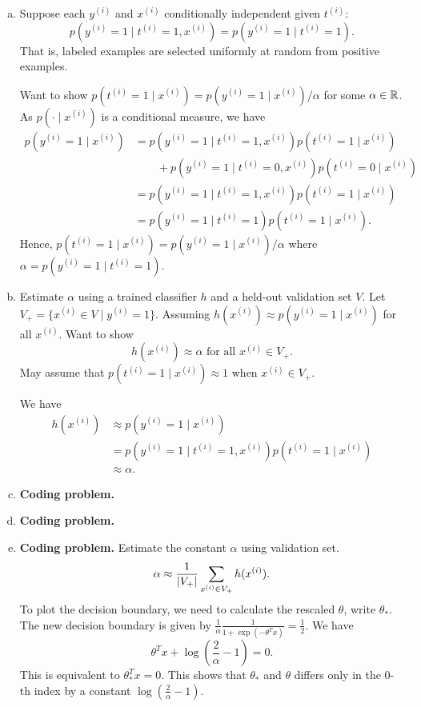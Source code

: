 \documentclass[12pt,letterpaper,boxed]{hmcpset}
\newcommand{\yy}{y^{(i)}}
\newcommand{\xx}{x^{(i)}}
\renewcommand{\tt}{t^{(i)}}
\begin{document}
\begin{solution}
\begin{enumerate}[(a)]
	\item Suppose each $\yy$ and $\xx$ conditionally independent given $\tt$:
	\[
	p(\yy = 1 \mid \tt = 1, \xx) = p(\yy = 1 \mid \tt = 1).
	\]
	That is, labeled examples are selected uniformly at random from positive examples.
	
	Want to show $p(\tt = 1 \mid \xx) = p(\yy = 1 \mid \xx) / \alpha$ for some $\alpha \in \mathbb{R}$. As $p(\cdot \mid \xx)$ is a conditional measure, we have
	\[
	\begin{aligned}
		p(\yy = 1 \mid \xx) &= p(\yy = 1 \mid \tt = 1, \xx) p(\tt = 1 \mid \xx) \\
		& \qquad + p(\yy = 1 \mid \tt = 0, \xx) p(\tt = 0 \mid \xx) \\
		&= p(\yy = 1 \mid \tt = 1, \xx) p(\tt = 1 \mid \xx) \\
		&= p(\yy = 1 \mid \tt = 1) p(\tt = 1 \mid \xx).
	\end{aligned}
	\]
	Hence, $p(\tt = 1 \mid \xx) = p(\yy = 1 \mid \xx) / \alpha$ where $\alpha = p(\yy = 1 \mid \tt = 1)$.
	
	\item Estimate $\alpha$ using a trained classifier $h$ and a held-out validation set $V$. Let $V_+ = \{\xx \in V \mid \yy = 1\}$. Assuming $h(\xx) \approx p(\yy = 1 \mid \xx)$ for all $\xx$. Want to show
	\[
	h(\xx) \approx \alpha \text{ for all } \xx \in V_+.
	\]
	May assume that $p(\tt = 1 \mid \xx) \approx 1$ when $\xx \in V_+$.
	
	We have
	\[
	\begin{aligned}
		h(\xx) &\approx p(\yy = 1 \mid \xx) \\
		&= p(\yy = 1 \mid \tt = 1, \xx) p(\tt = 1 \mid \xx) \\
		&\approx \alpha.
	\end{aligned}
	\]
	
	\item \textbf{Coding problem.}
	
	\item \textbf{Coding problem.}
	
	\item \textbf{Coding problem.} Estimate the constant $\alpha$ using validation set.
  \[
  \alpha \approx \frac{1}{\abs{V_+}} \sum_{\xx \in V_+} h(\xx).
  \]
  To plot the decision boundary, we need to calculate the rescaled $\theta$, write $\theta_*$. The new decision boundary is given by $\frac{1}{\alpha} \frac{1}{1+ \exp(-\theta^T x)} = \frac{1}{2}$. We have
  \[
  \theta^T x + \log(\frac{2}{\alpha} - 1) = 0.
  \]
  This is equivalent to $\theta_*^T x = 0$. This shows that $\theta_*$ and $\theta$ differs only in the 0-th index by a constant $\log(\frac{2}{\alpha} - 1)$.
\end{enumerate}
\end{solution}
\end{document}
